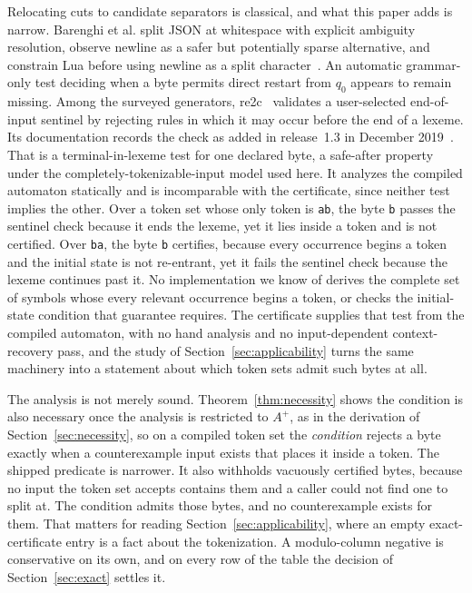 \documentclass[11pt,a4paper]{article}
\theoremstyle{definition}
\theoremstyle{plain}
\newcommand{\code}[1]{\texttt{#1}}
\begin{document}
Relocating cuts to candidate separators is classical, and what this paper adds is narrow. Barenghi et al. split JSON at
whitespace with explicit ambiguity resolution, observe newline as a safer but potentially sparse alternative, and
constrain Lua before using newline as a split character~\cite{barenghi2015parallel}. An automatic grammar-only test
deciding when a byte permits direct restart from $q_0$ appears to remain missing. Among the surveyed generators,
re2c~\cite{trofimovich2020re2c} validates a user-selected end-of-input sentinel by rejecting rules in which it may occur
before the end of a lexeme. Its documentation records the check as added in release~1.3 in December
2019~\cite{re2cdocs}. That is a terminal-in-lexeme test for one declared byte, a safe-after property under the
completely-tokenizable-input model used here. It analyzes the compiled automaton statically and is incomparable with the
certificate, since neither test implies the other. Over a token set whose only token is \code{ab}, the byte \code{b}
passes the sentinel check because it ends the lexeme, yet it lies inside a token and is not certified. Over \code{ba},
the byte \code{b} certifies, because every occurrence begins a token and the initial state is not re-entrant, yet it
fails the sentinel check because the lexeme continues past it. No implementation we know of derives the complete set of
symbols whose every relevant occurrence begins a token, or checks the initial-state condition that guarantee requires.
The certificate supplies that test from the compiled automaton, with no hand analysis and no input-dependent
context-recovery pass, and the study of Section~\ref{sec:applicability} turns the same machinery into a statement about
which token sets admit such bytes at all.

The analysis is not merely sound. Theorem~\ref{thm:necessity} shows the condition is also necessary once the analysis is
restricted to $A^+$, as in the derivation of Section~\ref{sec:necessity}, so on a compiled token set the
\emph{condition} rejects a byte exactly when a counterexample input exists that places it inside a token. The shipped
predicate is narrower. It also withholds vacuously certified bytes, because no input the token set accepts contains them
and a caller could not find one to split at. The condition admits those bytes, and no counterexample exists for them.
That matters for reading Section~\ref{sec:applicability}, where an empty exact-certificate entry is a fact about the
tokenization. A modulo-column negative is conservative on its own, and on every row of the table the decision of
Section~\ref{sec:exact} settles it.
\end{document}
